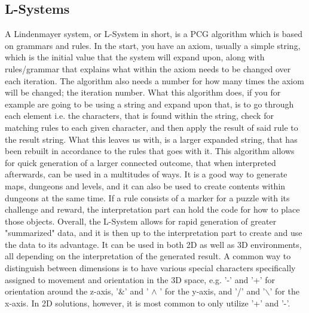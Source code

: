 \subsection{L-Systems}
A Lindenmayer system, or L-System in short, is a PCG algorithm which is based on grammars and rules. In the start, you have an axiom, usually a simple string, which is the initial value that the system will expand upon, along with rules/grammar that explains what within the axiom needs to be changed over each iteration. The algorithm also needs a number for how many times the axiom will be changed; the iteration number. What this algorithm does, if you for example are going to be using a string and expand upon that, is to go through each element i.e. the characters, that is found within the string, check for matching rules to each given character, and then apply the result of said rule to the result string.
What this leaves us with, is a larger expanded string, that has been rebuilt in accordance to the rules that goes with it. This algorithm allows for quick generation of a larger connected outcome, that when interpreted afterwards, can be used in a multitudes of ways. It is a good way to generate maps, dungeons and levels, and it can also be used to create contents within dungeons at the same time. If a rule consists of a marker for a puzzle with its challenge and reward, the interpretation part can hold the code for how to place those objects. 
Overall, the L-System allows for rapid generation of greater "summarized" data, and it is then up to the interpretation part to create and use the data to its advantage.
It can be used in both 2D as well as 3D environments, all depending on the interpretation of the generated result. A common way to distinguish between dimensions is to have various special characters specifically assigned to movement and orientation in the 3D space, e.g. '-' and '+' for orientation around the z-axis, '$\&$' and ' $\wedge$ ' for the y-axis, and '/' and '$\backslash$' for the x-axis. In 2D solutions, however, it is most common to only utilize '+' and '-'. 

